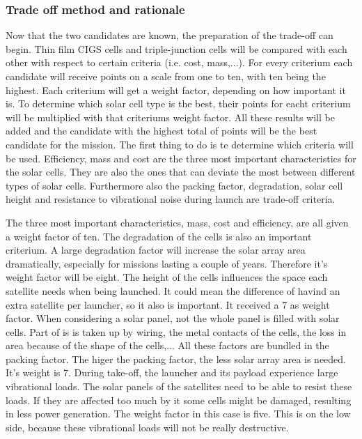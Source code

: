 \subsubsection{Trade off method and rationale}
\label{TO_weight}
Now that the two candidates are known, the preparation of the trade-off can begin. Thin film CIGS cells and triple-junction cells will be compared with each other with respect to certain criteria (i.e. cost, mass,...). For every criterium each candidate will receive points on a scale from one to ten, with ten being the highest. Each criterium will get a weight factor, depending on how important it is. To determine which solar cell type is the best, their points for eacht criterium will be multiplied with that criteriums weight factor. All these results will be added and the candidate with the highest total of points will be the best candidate for the mission. 
The first thing to do is te determine which criteria will be used. Efficiency, mass and cost are the three most important characteristics for the solar cells. They are also the ones that can deviate the most between different types of solar cells. Furthermore also the packing factor, degradation, solar cell height and resistance to vibrational noise during launch are trade-off criteria. 

The three most important characteristics, mass, cost and efficiency, are all given a weight factor of ten. The degradation of the cells is also an important criterium. A large degradation factor will increase the solar array area dramatically, especially for missions lasting a couple of years. Therefore it's weight factor will be eight. The height of the cells influences the space each satellite needs when being launched. It could mean the difference of havind an extra satellite per launcher, so it also is important. It received a 7 as weight factor.
When considering a solar panel, not the whole panel is filled with solar cells. Part of is is taken up by wiring, the metal contacts of the cells, the loss in area because of the shape of the cells,... All these factors are bundled in the packing factor. The higer the packing factor, the less solar array area is needed. It's weight is 7.
During take-off, the launcher and its payload experience large vibrational loads. The solar panels of the satellites need to be able to resist these loads. If they are affected too much by it some cells might be damaged, resulting in less power generation. The weight factor in this case is five. This is on the low side, because these vibrational loads will not be really destructive. 

